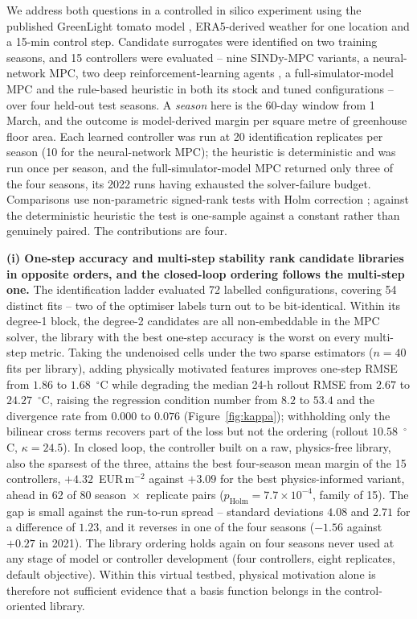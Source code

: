 We address both questions in a controlled in silico experiment using the published
GreenLight tomato model \cite{katzin2020,vanlaatum2025}, ERA5-derived weather for one
location and a 15-min control step. Candidate surrogates were identified on two training
seasons, and 15 controllers were evaluated -- nine SINDy-MPC variants, a
neural-network MPC, two deep reinforcement-learning agents
\cite{schulman2017,haarnoja2018,raffin2021},
a full-simulator-model MPC and the rule-based heuristic in both
its stock and tuned configurations -- over four held-out test seasons. A \emph{season}
here is the 60-day window from 1 March, and the outcome is model-derived margin per square
metre of greenhouse floor area. Each learned controller was run at 20 identification
replicates per season (10 for
the neural-network MPC); the heuristic is deterministic and was run once per season, and
the full-simulator-model MPC returned only three of the four seasons, its 2022 runs having
exhausted the solver-failure budget. Comparisons use non-parametric signed-rank tests with
Holm correction \cite{wilcoxon1945,holm1979,demsar2006}; against the deterministic
heuristic the test is one-sample against a constant rather than genuinely paired. The
contributions are four.

\textbf{(i) One-step accuracy and multi-step stability rank candidate libraries in
opposite orders, and the closed-loop ordering follows the multi-step one.} The
identification ladder evaluated 72 labelled configurations, covering 54 distinct fits --
two of the optimiser labels turn out to be bit-identical. Within its degree-1 block, the degree-2 candidates are all non-embeddable in the MPC solver, the library with the
best one-step accuracy is the worst on every multi-step metric. Taking the undenoised
cells under the two sparse estimators ($n = 40$ fits per library), adding physically
motivated features improves
one-step RMSE from $1.86$ to $1.68$~$^\circ$C while degrading the median 24-h rollout RMSE
from $2.67$ to $24.27$~$^\circ$C, raising the regression condition number from $8.2$ to
$53.4$ and the divergence rate from $0.000$ to $0.076$ (Figure~\ref{fig:kappa});
withholding only the bilinear cross terms recovers part of the loss but not the ordering
(rollout $10.58$~$^\circ$C, $\kappa = 24.5$). In closed loop, the controller built on a raw, physics-free library, also the sparsest of
the three, attains the best four-season mean margin of the 15 controllers, $+4.32$~EUR\,m$^{-2}$ against $+3.09$
for the best physics-informed variant, ahead in 62 of 80 season~$\times$~replicate pairs
($p_{\mathrm{Holm}} = 7.7 \times 10^{-4}$, family of 15). The gap is small against the
run-to-run spread -- standard deviations $4.08$ and $2.71$ for a difference of $1.23$, and it reverses in one of the four seasons ($-1.56$ against $+0.27$ in 2021). The library
ordering holds again on four seasons never used at any stage of model or controller
development (four controllers, eight replicates, default objective). Within this virtual
testbed, physical motivation alone is therefore not sufficient evidence that a basis
function belongs in the control-oriented library.

